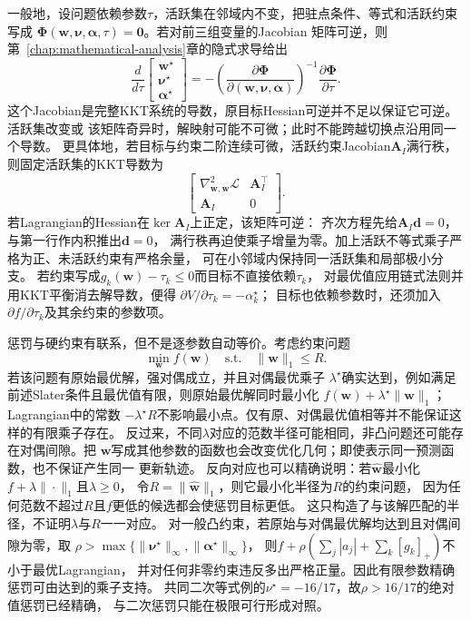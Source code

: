 一般地，设问题依赖参数$\tau$，活跃集在邻域内不变，把驻点条件、等式和活跃约束写成
$\bm{\Phi}(\bm{w},\bm{\nu},\bm{\alpha},\tau)=\bm{0}$。若对前三组变量的Jacobian
矩阵可逆，则第~\ref{chap:mathematical-analysis}章的隐式求导给出
\[
  \frac{d}{d\tau}
  \begin{bmatrix}\bm{w}^{\star}\\\bm{\nu}^{\star}\\\bm{\alpha}^{\star}\end{bmatrix}
  =
  -\left(\frac{\partial\bm{\Phi}}
  {\partial(\bm{w},\bm{\nu},\bm{\alpha})}\right)^{-1}
  \frac{\partial\bm{\Phi}}{\partial\tau}.
\]
这个Jacobian是完整KKT系统的导数，原目标Hessian可逆并不足以保证它可逆。活跃集改变或
该矩阵奇异时，解映射可能不可微；此时不能跨越切换点沿用同一个导数。
更具体地，若目标与约束二阶连续可微，活跃约束Jacobian$\bm A_I$满行秩，
则固定活跃集的KKT导数为
\[
 \begin{bmatrix}
 \nabla_{\bm w,\bm w}^2\mathcal L&\bm A_I^\top\\
 \bm A_I&0
 \end{bmatrix}.
\]
若Lagrangian的Hessian在$\ker\bm A_I$上正定，该矩阵可逆：
齐次方程先给$\bm A_I\bm d=0$，与第一行作内积推出$\bm d=0$，
满行秩再迫使乘子增量为零。加上活跃不等式乘子严格为正、未活跃约束有严格余量，
可在小邻域内保持同一活跃集和局部极小分支。
若约束写成$g_k(\bm w)-\tau_k\leq0$而目标不直接依赖$\tau_k$，
对最优值应用链式法则并用KKT平衡消去解导数，便得
$\partial V/\partial\tau_k=-\alpha_k^\star$；
目标也依赖参数时，还须加入$\partial f/\partial\tau_k$及其余约束的参数项。

惩罚与硬约束有联系，但不是逐参数自动等价。考虑约束问题
\[
  \min_{\bm{w}}f(\bm{w})
  \quad\text{s.t.}\quad
  \lVert\bm{w}\rVert_1\leq R.
\]
若该问题有原始最优解，强对偶成立，并且对偶最优乘子
$\lambda^\star$确实达到，例如满足前述Slater条件且最优值有限，则原始最优解同时最小化
$f(\bm{w})+\lambda^\star\lVert\bm{w}\rVert_1$；Lagrangian中的常数
$-\lambda^\star R$不影响最小点。仅有原、对偶最优值相等并不能保证这样的有限乘子存在。
反过来，不同$\lambda$对应的范数半径可能相同，非凸问题还可能存在对偶间隙。把
$\bm{w}$写成其他参数的函数也会改变优化几何；即使表示同一预测函数，也不保证产生同一
更新轨迹。
反向对应也可以精确说明：若$\widehat{\bm w}$最小化$f+\lambda\|\cdot\|_1$且$\lambda\geq0$，
令$R=\|\widehat{\bm w}\|_1$，则它最小化半径为$R$的约束问题，
因为任何范数不超过$R$且$f$更低的候选都会使惩罚目标更低。
这只构造了与该解匹配的半径，不证明$\lambda$与$R$一一对应。
对一般凸约束，若原始与对偶最优解均达到且对偶间隙为零，取
$\rho>\max\{\|\bm\nu^\star\|_\infty,\|\bm\alpha^\star\|_\infty\}$，
则$f+\rho(\sum_j|a_j|+\sum_k[g_k]_+)$不小于最优Lagrangian，
并对任何非零约束违反多出严格正量。因此有限参数精确惩罚可由达到的乘子支持。
共同二次等式例的$\nu^\star=-16/17$，故$\rho>16/17$的绝对值惩罚已经精确，
与二次惩罚只能在极限可行形成对照。

